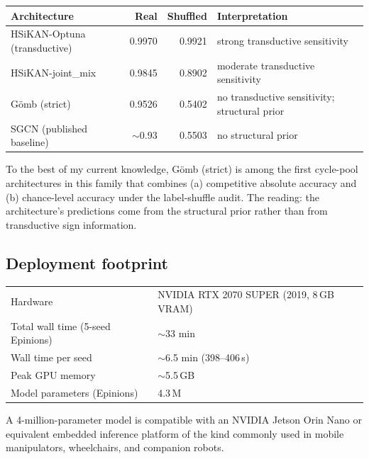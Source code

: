 \documentclass[11pt,a4paper]{article}
\begin{document}
\begin{center}
\begin{tabular}{lrrl}
\toprule
Architecture                 & Real    & Shuffled & Interpretation                              \\
\midrule
HSiKAN-Optuna (transductive) & 0.9970  & 0.9921   & strong transductive sensitivity             \\
HSiKAN-joint\_mix            & 0.9845  & 0.8902   & moderate transductive sensitivity           \\
G\"omb (strict)              & 0.9526  & 0.5402   & no transductive sensitivity; structural prior \\
SGCN (published baseline)    & $\sim$0.93 & 0.5503 & no structural prior                         \\
\bottomrule
\end{tabular}
\end{center}

To the best of my current knowledge, G\"omb (strict) is among the
first cycle-pool architectures in this family that combines (a)
competitive absolute accuracy and (b) chance-level accuracy under
the label-shuffle audit. The reading: the architecture's
predictions come from the structural prior rather than from
transductive sign information.

\subsection{Deployment footprint}

\begin{center}
\begin{tabular}{ll}
\toprule
Hardware                          & NVIDIA RTX 2070 SUPER (2019, 8\,GB VRAM) \\
Total wall time (5-seed Epinions) & $\sim$33 min                              \\
Wall time per seed                & $\sim$6.5 min (398--406\,s)               \\
Peak GPU memory                   & $\sim$5.5\,GB                             \\
Model parameters (Epinions)       & 4.3\,M                                    \\
\bottomrule
\end{tabular}
\end{center}

A 4-million-parameter model is compatible with an NVIDIA Jetson
Orin Nano or equivalent embedded inference platform of the kind
commonly used in mobile manipulators, wheelchairs, and companion
robots.
\end{document}
